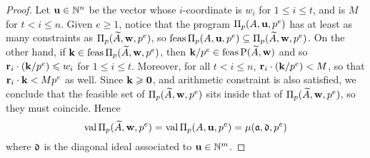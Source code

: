 \documentclass[11pt]{amsart}
\begin{document}
\begin{proof}
Let $\mathbf{u} \in \mathbb{N}^n$ be the vector whose $i$-coordinate is $w_i$ for $1 \leq i \leq t$, and is $M$ for $t < i \leq n$.
Given $e \geq 1$, notice that the program $\Pi_p(A, \mathbf{u}, p^e)$ has at least as many constraints as $\Pi_p(\widetilde{A}, \mathbf{w},p^e)$, so
$\operatorname{feas} \Pi_p(A, \mathbf{u}, p^e) \subseteq \Pi_p(\widetilde{A}, \mathbf{w}, p^e)$.
On the other hand, if $\mathbf{k} \in \operatorname{feas} \Pi_p(\widetilde{A}, \mathbf{w},p^e)$, then 
$\mathbf{k}/p^e \in \operatorname{feas}\mathrm{P}(\widetilde{A},\mathbf{w})$ and so
$\mathbf{r}_i \cdot (\mathbf{k}/p^e) \leqslant w_i$ for $1 \leq i \leq t$.  
Moreover,  for all $t < i \leq n$, 
$\mathbf{r}_i \cdot (\mathbf{k}/p^e) < M$, so that $\mathbf{r}_i \cdot \mathbf{k} < M p^e$ as well.
Since $\mathbf{k} \geqslant \mathbf{0}$, and arithmetic constraint is also satisfied, we conclude that the feasible set of $\Pi_p(\widetilde{A}, \mathbf{w}, p^e)$ sits inside that of $\Pi_p(\widetilde{A}, \mathbf{w}, p^e)$, so they must coincide. 
Hence 
\[
 \operatorname{val}\Pi_p(\widetilde{A}, \mathbf{w}, p^e) = \operatorname{val} \Pi_p(A, \mathbf{u}, p^e) = \mu(\mathfrak{a}, \mathfrak{d}, p^e)
\]
where $\mathfrak{d}$ is the diagonal ideal associated to $\mathbf{u} \in \mathbb{N}^m$. 
\end{proof}
\end{document}
